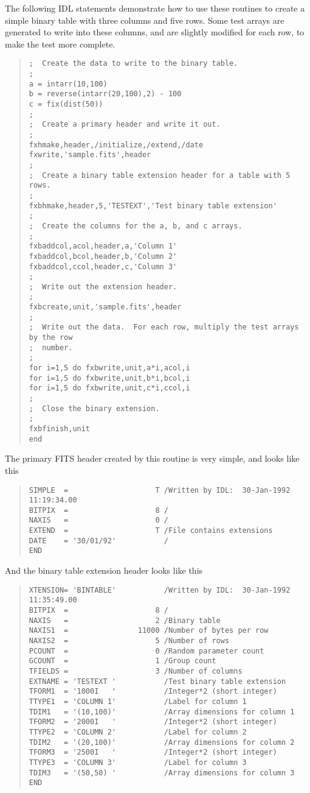 The following IDL statements demonstrate how to use these routines to create a
simple binary table with three columns and five rows.  Some test arrays are
generated to write into these columns, and are slightly modified for each row,
to make the test more complete.
%
\begin{quote}
\begin{verbatim}
;  Create the data to write to the binary table.
;
a = intarr(10,100)
b = reverse(intarr(20,100),2) - 100
c = fix(dist(50))
;
;  Create a primary header and write it out.
;
fxhmake,header,/initialize,/extend,/date
fxwrite,'sample.fits',header
;
;  Create a binary table extension header for a table with 5 rows.
;
fxbhmake,header,5,'TESTEXT','Test binary table extension'
;
;  Create the columns for the a, b, and c arrays.
;
fxbaddcol,acol,header,a,'Column 1'
fxbaddcol,bcol,header,b,'Column 2'
fxbaddcol,ccol,header,c,'Column 3'
;
;  Write out the extension header.
;
fxbcreate,unit,'sample.fits',header
;
;  Write out the data.  For each row, multiply the test arrays by the row
;  number.
;
for i=1,5 do fxbwrite,unit,a*i,acol,i
for i=1,5 do fxbwrite,unit,b*i,bcol,i
for i=1,5 do fxbwrite,unit,c*i,ccol,i
;
;  Close the binary extension.
;
fxbfinish,unit
end
\end{verbatim}
\end{quote}
%
The primary FITS header created by this routine is very simple, and looks like
this
%
\begin{quote}
\begin{verbatim}
SIMPLE  =                    T /Written by IDL:  30-Jan-1992 11:19:34.00
BITPIX  =                    8 /
NAXIS   =                    0 /
EXTEND  =                    T /File contains extensions
DATE    = '30/01/92'           /
END
\end{verbatim}
\end{quote}
%
And the binary table extension header looks like this
%
\begin{quote}
\begin{verbatim}
XTENSION= 'BINTABLE'           /Written by IDL:  30-Jan-1992 11:35:49.00
BITPIX  =                    8 /
NAXIS   =                    2 /Binary table
NAXIS1  =                11000 /Number of bytes per row
NAXIS2  =                    5 /Number of rows
PCOUNT  =                    0 /Random parameter count
GCOUNT  =                    1 /Group count
TFIELDS =                    3 /Number of columns
EXTNAME = 'TESTEXT '           /Test binary table extension
TFORM1  = '1000I   '           /Integer*2 (short integer)
TTYPE1  = 'COLUMN 1'           /Label for column 1
TDIM1   = '(10,100)'           /Array dimensions for column 1
TFORM2  = '2000I   '           /Integer*2 (short integer)
TTYPE2  = 'COLUMN 2'           /Label for column 2
TDIM2   = '(20,100)'           /Array dimensions for column 2
TFORM3  = '2500I   '           /Integer*2 (short integer)
TTYPE3  = 'COLUMN 3'           /Label for column 3
TDIM3   = '(50,50) '           /Array dimensions for column 3
END
\end{verbatim}
\end{quote}

